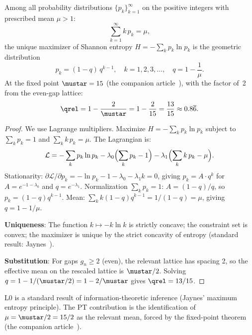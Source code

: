 \documentclass[12pt,a4paper]{article}
\begin{document}
\mTHM
\begin{theorem}
\label{thm:L0}
Among all probability distributions $\{p_k\}_{k=1}^\infty$ on the
positive integers with prescribed mean $\mu > 1$:
\[
  \sum_{k=1}^\infty k\, p_k = \mu,
\]
the unique maximizer of Shannon entropy $H = -\sum_k p_k \ln p_k$ is
the geometric distribution
\begin{equation}
  p_k = (1-q)\, q^{k-1}, \quad k = 1, 2, 3, \ldots,
  \quad q = 1 - \frac{1}{\mu}.
  \label{eq:geometric}
\end{equation}
At the fixed point $\mustar = 15$ (the companion article~\cite{companion_M3}), with the factor of~2
from the even-gap lattice:
\begin{equation}
  \qrel = 1 - \frac{2}{\mustar} = 1 - \frac{2}{15} = \frac{13}{15}
         \approx 0.8\overline{6}.
  \label{eq:qstat}
\end{equation}

\begin{proof}
We use Lagrange multipliers. Maximize $H = -\sum_k p_k \ln p_k$
subject to $\sum_k p_k = 1$ and $\sum_k k\, p_k = \mu$. The Lagrangian is:
\[
  \mathcal{L} = -\sum_k p_k \ln p_k
    - \lambda_0 \Bigl(\sum_k p_k - 1\Bigr)
    - \lambda_1 \Bigl(\sum_k k\, p_k - \mu\Bigr).
\]
Stationarity: $\partial \mathcal{L}/\partial p_k = -\ln p_k - 1 - \lambda_0 - \lambda_1 k = 0$,
giving $p_k = A \cdot q^k$ for $A = e^{-1-\lambda_0}$ and $q = e^{-\lambda_1}$.
Normalization $\sum_k p_k = 1$: $A = (1-q)/q$, so $p_k = (1-q) q^{k-1}$.
Mean: $\sum_k k(1-q)q^{k-1} = 1/(1-q) = \mu$, giving $q = 1 - 1/\mu$.

\textbf{Uniqueness}: The function $k \mapsto -k\ln k$ is strictly concave;
the constraint set is convex; the maximizer is unique by the strict concavity
of entropy (standard result: Jaynes~\cite{Jaynes1957}).

\textbf{Substitution}: For gaps $g_n \geq 2$ (even), the relevant lattice
has spacing 2, so the effective mean on the rescaled lattice is $\mustar/2$.
Solving $q = 1 - 1/(\mustar/2) = 1 - 2/\mustar$ gives $\qrel = 13/15$.
\end{proof}
\end{theorem}

\begin{remark}
L0 is a standard result of information-theoretic inference (Jaynes' maximum
entropy principle). The PT contribution is the identification of $\mu = \mustar/2 = 15/2$
as the relevant mean, forced by the fixed-point theorem (the companion article~\cite{companion_M3}).
\end{remark}
\end{document}
